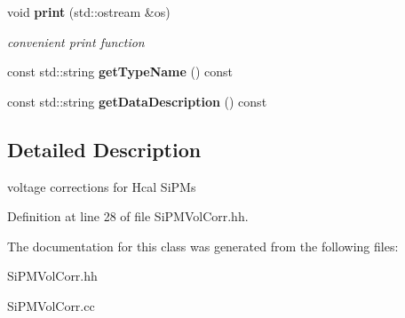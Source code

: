 \begin{DoxyCompactItemize}
\item 
void {\bf print} (std::ostream \&os)\label{classCALICE_1_1SiPMVolCorr_a5434b764d344b24ce8f21006b43eb52e}

\begin{DoxyCompactList}\small\item\em convenient print function \item\end{DoxyCompactList}\item 
const std::string {\bfseries getTypeName} () const \label{classCALICE_1_1SiPMVolCorr_a3299bdb8b4986f2eef6829320116dba7}

\item 
const std::string {\bfseries getDataDescription} () const \label{classCALICE_1_1SiPMVolCorr_a7f369893fee47d5131ba81367aa04b38}

\end{DoxyCompactItemize}


\subsection{Detailed Description}
voltage corrections for Hcal SiPMs 

Definition at line 28 of file SiPMVolCorr.hh.

The documentation for this class was generated from the following files:\begin{DoxyCompactItemize}
\item 
SiPMVolCorr.hh\item 
SiPMVolCorr.cc\end{DoxyCompactItemize}
